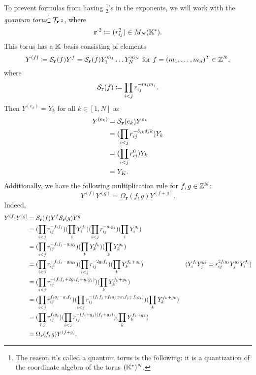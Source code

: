 \documentclass{article}
\begin{document}
To prevent formulas from having $\frac{1}{2}$'s in the exponents,
we will work with the \emph{quantum torus}\footnote{
    The reason it's called a quantum torus is the following:
    it is a quantization of the coordinate algebra of the torus $(\mathbb{K}^{*})^N$.
}
$\mathcal{T}_{\mathbf{r}^{\cdot 2}}$,
where
\begin{equation*}
    \mathbf{r}^{\cdot 2} \coloneq (r_{ij}^2) \in M_N(\mathbb{K}^*).
\end{equation*}
This torus has a $\mathbb{K}$-basis consisting of elements
\begin{equation*}
    Y^{(f)} \coloneq \mathcal{S}_{\mathbf{r}}(f)Y^f = \mathcal{S}_{\mathbf{r}}(f)Y_1^{m_1}\dots Y_N^{m_N}
    \text{ for } f = (m_1, \dots, m_n)^T \in \mathbb{Z}^N,
\end{equation*}
where
\begin{equation*}
    \mathcal{S}_{\mathbf{r}}(f) \coloneq \prod_{i < j}r_{ij}^{-m_im_j}.
\end{equation*}
Then $Y^{(e_k)} = Y_k$ for all $k \in [1, N]$ as
\begin{align*}
    Y^{(e_k)}
     & = \mathcal{S}_{\mathbf{r}}(e_k)Y^{e_k}                      \\
     & = (\prod_{i < j}r_{ij}^{-\delta_{ik}\delta{jk}} )Y_k \\
     & = (\prod_{i < j}r_{ij}^0 )Y_k                        \\
     & = Y_K.
\end{align*}
Additionally, we have the following multiplication rule for $f,g \in \mathbb{Z}^N$:
\begin{equation*}
    Y^{(f)}Y^{(g)} = \Omega_{\mathbf{r}}(f,g)Y^{(f+g)}.
\end{equation*}
Indeed,
\begin{align*}
    Y^{(f)}Y^{(g)}
     & = \mathcal{S}_{\mathbf{r}}(f)Y^f\mathcal{S}_{\mathbf{r}}(g)Y^g                                    \\
     & = (\prod_{i < j}r_{ij}^{-f_if_j})(\prod_{i}Y_i^{f_i})
    (\prod_{i < j}r_{ij}^{-g_ig_j})( \prod_{i}Y_i^{g_i})                                   \\
     & = (\prod_{i < j}r_{ij}^{-f_if_j - g_ig_j})
    (\prod_{k}Y_k^{f_k})(\prod_{k}Y_k^{g_k})                                               \\
     & = (\prod_{i < j}r_{ij}^{-f_if_j - g_ig_j})
    (\prod_{i < j}r_{ij}^{-2g_if_j})(\prod_{k}Y_k^{f_k + g_k})
     & (Y_i^{f_i} Y_j^{g_j} = r_{ij}^{2f_ig_j}Y_j^{g_j}Y_i^{f_i})                          \\
     & = (\prod_{i < j}r_{ij}^{-(f_if_j +2g_if_j + g_ig_j)})
    (\prod_{k}Y_k^{f_k + g_k})                                                             \\
     & = (\prod_{i < j}r_{ij}^{f_ig_j - g_if_j})
    (\prod_{i < j}r_{ij}^{-(f_if_j + f_ig_j + g_if_j + f_ig_j)})(\prod_{k}Y_k^{f_k + g_k}) \\
     & = (\prod_{i,j}r_{ij}^{f_ig_j})
    (\prod_{i < j}r_{ij}^{-(f_i + g_j)(f_j + g_j)})(\prod_{k}Y_k^{f_k + g_k})              \\
     & = \Omega_{\mathbf{r}}(f,g)Y^{(f + g)}.
\end{align*}
\end{document}
